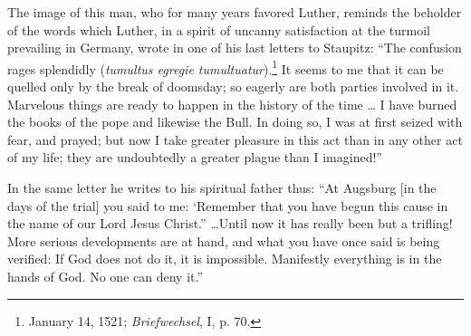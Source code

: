 The image of this man, who for many years favored Luther, reminds
the beholder of the words which Luther, in a spirit of uncanny
satisfaction at the turmoil prevailing in Germany, wrote in one of his
last letters to Staupitz: “The confusion rages splendidly (\textit{tumultus
egregie tumultuatur}).\footnote{January 14, 1521; \textit{Briefwechsel}, I, p. 70.}
It seems to me that it can be quelled only
by the break of doomsday; so eagerly are both parties involved in it.
Marvelous things are ready to happen in the history of the time \dots
I have burned the books of the pope and likewise the Bull. In doing
so, I was at first seized with fear, and prayed; but now I take greater
pleasure in this act than in any other act of my life; they are undoubtedly
a greater plague than I imagined!”

In the same letter he writes to his spiritual father thus: “At Augsburg
[in the days of the trial] you said to me: ‘Remember that you
have begun this cause in the name of our Lord Jesus Christ.” \dots Until
now it has really been but a trifling! More serious developments are
at hand, and what you have once said is being verified: If God does
not do it, it is impossible. Manifestly everything is in the hands of
God. No one can deny it.”
